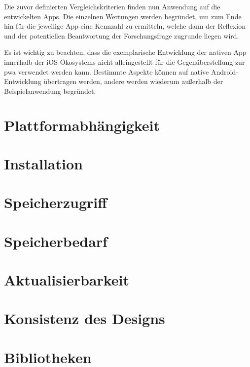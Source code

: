 Die zuvor definierten Vergleichskriterien finden nun Anwendung auf die entwickelten Apps. Die einzelnen Wertungen werden begründet, um zum Ende hin für die jeweilige App eine Kennzahl zu ermitteln, welche dann der Reflexion und der potentiellen Beantwortung der Forschungsfrage zugrunde liegen wird.

Es ist wichtig zu beachten, dass die exemplarische Entwicklung der nativen App innerhalb der iOS-Ökosystems nicht alleingestellt für die Gegenüberstellung zur \ac{pwa} verwendet werden kann. Bestimmte Aspekte können auf native Android-Entwicklung übertragen werden, andere werden wiederum außerhalb der Beispielanwendung begründet.

\section{Plattformabhängigkeit} \label{sec:6-plattform}


\section{Installation} \label{sec:6-installation}


\section{Speicherzugriff} \label{sec:6-speicherzugriff}


\section{Speicherbedarf} \label{sec:6-speicherbedarf}


\section{Aktualisierbarkeit} \label{sec:6-aktualisierbarkeit}


\section{Konsistenz des Designs} \label{sec:6-konsistenz-des-designs}


\section{Bibliotheken} \label{sec:6-bibliotheken}


